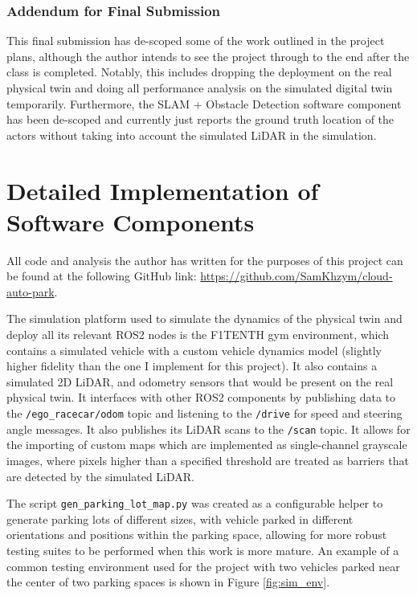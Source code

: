 \subsubsection{Addendum for Final Submission}

This final submission has de-scoped some of the work outlined in the project plans, although the author intends to see the project through to the end after the class is completed. Notably, this includes dropping the deployment on the real physical twin and doing all performance analysis on the simulated digital twin temporarily. Furthermore, the SLAM + Obstacle Detection software component has been de-scoped and currently just reports the ground truth location of the actors without taking into account the simulated LiDAR in the simulation.

\section{Detailed Implementation of Software Components}

All code and analysis the author has written for the purposes of this project can be found at the following GitHub link: \url{https://github.com/SamKhzym/cloud-auto-park}.

The simulation platform used to simulate the dynamics of the physical twin and deploy all its relevant ROS2 nodes is the F1TENTH gym environment, which contains a simulated vehicle with a custom vehicle dynamics model (slightly higher fidelity than the one I implement for this project). It also contains a simulated 2D LiDAR, and odometry sensors that would be present on the real physical twin. It interfaces with other ROS2 components by publishing data to the \verb|/ego_racecar/odom| topic and listening to the \verb|/drive| for speed and steering angle messages. It also publishes its LiDAR scans to the \verb|/scan| topic. It allows for the importing of custom maps which are implemented as single-channel grayscale images, where pixels higher than a specified threshold are treated as barriers that are detected by the simulated LiDAR.

The script \verb|gen_parking_lot_map.py| was created as a configurable helper to generate parking lots of different sizes, with vehicle parked in different orientations and positions within the parking space, allowing for more robust testing suites to be performed when this work is more mature. An example of a common testing environment used for the project with two vehicles parked near the center of two parking spaces is shown in Figure \ref{fig:sim_env}.

